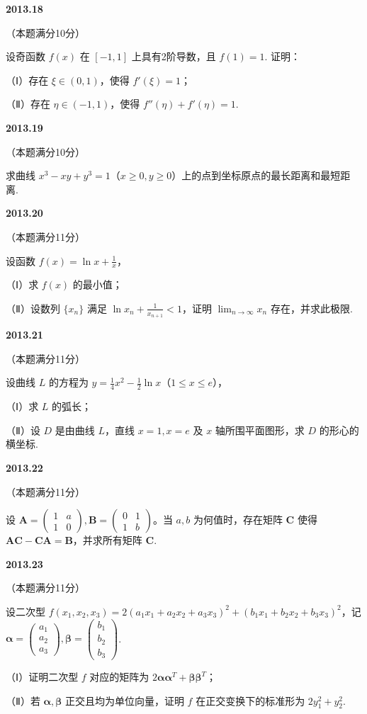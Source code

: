 \documentclass[UTF8,12pt,fontset=windows]{ctexart}
\begin{document}
\vfill
\newpage
{\large\bfseries 2013.18}

（本题满分10分）

设奇函数 $f(x)$ 在 $[-1, 1]$ 上具有2阶导数，且 $f(1) = 1$. 证明：

（Ⅰ）存在 $\xi \in (0, 1)$，使得 $f'(\xi) = 1$；

（Ⅱ）存在 $\eta \in (-1, 1)$，使得 $f''(\eta) + f'(\eta) = 1$.

\vfill
\newpage
{\large\bfseries 2013.19}

（本题满分10分）

求曲线 $x^3 - xy + y^3 = 1$（$x \ge 0, y \ge 0$）上的点到坐标原点的最长距离和最短距离.

\vfill
\newpage
{\large\bfseries 2013.20}

（本题满分11分）

设函数 $f(x) = \ln x + \frac{1}{x}$，

（Ⅰ）求 $f(x)$ 的最小值；

（Ⅱ）设数列 $\{x_n\}$ 满足 $\ln x_n + \frac{1}{x_{n+1}} < 1$，证明 $\lim_{n \to \infty}x_n$ 存在，并求此极限.

\vfill
\newpage
{\large\bfseries 2013.21}

（本题满分11分）

设曲线 $L$ 的方程为 $y = \frac{1}{4}x^2 - \frac{1}{2}\ln x$（$1 \le x \le e$），

（Ⅰ）求 $L$ 的弧长；

（Ⅱ）设 $D$ 是由曲线 $L$，直线 $x = 1, x = e$ 及 $x$ 轴所围平面图形，求 $D$ 的形心的横坐标.

\vfill
\newpage
{\large\bfseries 2013.22}

（本题满分11分）

设 $\boldsymbol{A} = \begin{pmatrix} 1 & a \\ 1 & 0 \end{pmatrix}, \boldsymbol{B} = \begin{pmatrix} 0 & 1 \\ 1 & b \end{pmatrix}$。当 $a, b$ 为何值时，存在矩阵 $\boldsymbol{C}$ 使得 $\boldsymbol{AC} - \boldsymbol{CA} = \boldsymbol{B}$，并求所有矩阵 $\boldsymbol{C}$.

\vfill
\newpage
{\large\bfseries 2013.23}

（本题满分11分）

设二次型 $f(x_1, x_2, x_3) = 2(a_1x_1 + a_2x_2 + a_3x_3)^2 + (b_1x_1 + b_2x_2 + b_3x_3)^2$，记 $\boldsymbol{\alpha} = \begin{pmatrix} a_1 \\ a_2 \\ a_3 \end{pmatrix}, \boldsymbol{\beta} = \begin{pmatrix} b_1 \\ b_2 \\ b_3 \end{pmatrix}$.

（Ⅰ）证明二次型 $f$ 对应的矩阵为 $2\boldsymbol{\alpha}\boldsymbol{\alpha}^T + \boldsymbol{\beta}\boldsymbol{\beta}^T$；

（Ⅱ）若 $\boldsymbol{\alpha}, \boldsymbol{\beta}$ 正交且均为单位向量，证明 $f$ 在正交变换下的标准形为 $2y_1^2 + y_2^2$.

\vfill
\end{document}

